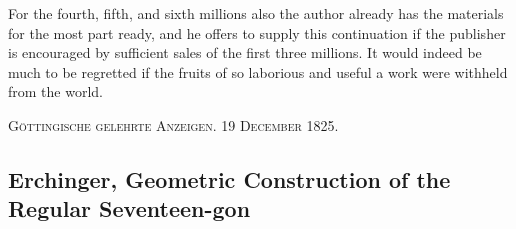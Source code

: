 \documentclass[12pt]{article}
\begin{document}
For the fourth, fifth, and sixth millions also the author already has the materials for the most part ready, and he offers to supply this continuation if the publisher is encouraged by sufficient sales of the first three millions. It would indeed be much to be regretted if the fruits of so laborious and useful a work were withheld from the world.

\begin{center}
\textsc{Göttingische gelehrte Anzeigen. 19 December 1825.}
\end{center}

\subsection*{Erchinger, Geometric Construction of the Regular Seventeen-gon}
\end{document}
